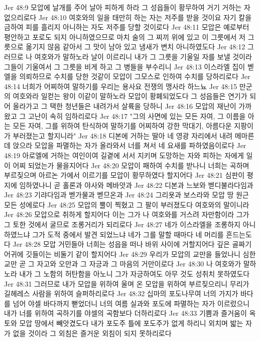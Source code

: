 Jer 48:9  모압에 날개를 주어 날아 피하게 하라 그 성읍들이 황무하여 거기 거하는 자 없으리로다
Jer 48:10  여호와의 일을 태만히 하는 자는 저주를 받을 것이요 자기 칼을 금하여 피를 흘리지 아니하는 자도 저주를 당할 것이로다
Jer 48:11  모압은 예로부터 평안하고 포로도 되지 아니하였으므로 마치 술의 그 찌끼 위에 있고 이 그릇에서 저 그릇으로 옮기지 않음 같아서 그 맛이 남아 있고 냄새가 변치 아니하였도다
Jer 48:12  그러므로 나 여호와가 말하노라 날이 이르리니 내가 그 그릇을 기울일 자를 보낼 것이라 그들이 기울여서 그 그릇을 비게 하고 그 병들을 부수리니
Jer 48:13  이스라엘 집이 벧엘을 의뢰하므로 수치를 당한 것같이 모압이 그모스로 인하여 수치를 당하리로다
Jer 48:14  너희가 어찌하여 말하기를 우리는 용사요 전쟁의 맹사라 하느뇨
Jer 48:15  만군의 여호와라 일컫는 왕이 이같이 말하노라 모압이 황폐되었도다 그 성읍들은 연기가 되어 올라가고 그 택한 청년들은 내려가서 살륙을 당하니
Jer 48:16  모압의 재난이 가까왔고 그 고난이 속히 임하리로다
Jer 48:17  "그의 사면에 있는 모든 자여, 그 이름을 아는 모든 자여, 그를 위하여 탄식하여 말하기를 어찌하여 강한 막대기, 아름다운 지팡이가 부러졌는고 할지니라"
Jer 48:18  디본에 거하는 딸아 네 영광 자리에서 내려 메마른데 앉으라 모압을 파멸하는 자가 올라와서 너를 쳐서 네 요새를 파하였음이로다
Jer 48:19  아로엘에 거하는 여인이여 길곁에 서서 지키며 도망하는 자와 피하는 자에게 일이 어찌 되었는가 물을지어다
Jer 48:20  모압이 패하여 수치를 받나니 너희는 곡하며 부르짖으며 아르논 가에서 이르기를 모압이 황무하였다 할지어다
Jer 48:21  심판이 평지에 임하였나니 곧 홀론과 야사와 메바앗과
Jer 48:22  디본과 느보와 벧디불라다임과
Jer 48:23  기랴다임과 벧가물과 벧므온과
Jer 48:24  그리욧과 보스라와 모압 땅 원근 모든 성에로다
Jer 48:25  모압의 뿔이 찍혔고 그 팔이 부러졌도다 여호와의 말이니라
Jer 48:26  모압으로 취하게 할지어다 이는 그가 나 여호와를 거스려 자만함이라 그가 그 토한 것에서 굴므로 조롱거리가 되리로다
Jer 48:27  네가 이스라엘을 조롱하지 아니하였느냐 그가 도적 중에서 발견 되었느냐 네가 그를 말할 때마다 네 머리를 흔드는도다
Jer 48:28  모압 거민들아 너희는 성읍을 떠나 바위 사이에 거할지어다 깊은 골짜기 어귀에 깃들이는 비둘기 같이 할지어다
Jer 48:29  우리가 모압의 교만을 들었나니 심한 교만 곧 그 자고와 오만과 그 자긍과 그 마음의 거만이로다
Jer 48:30  나 여호와가 말하노라 내가 그 노함의 허탄함을 아노니 그가 자긍하여도 아무 것도 성취치 못하였도다
Jer 48:31  그러므로 내가 모압을 위하여 울며 온 모압을 위하여 부르짖으리니 무리가 길헤레스 사람을 위하여 슬퍼하리로다
Jer 48:32  십마의 포도나무여 너의 가지가 바다를 넘어 야셀 바다까지 뻗었더니 너의 여름 실과와 포도에 파멸하는 자가 이르렀으니 내가 너를 위하여 곡하기를 야셀의 곡함보다 더하리로다
Jer 48:33  기쁨과 즐거움이 옥토와 모압 땅에서 빼앗겼도다 내가 포도주 틀에 포도주가 없게 하리니 외치며 밟는 자가 없을 것이라 그 외침은 즐거운 외침이 되지 못하리로다
